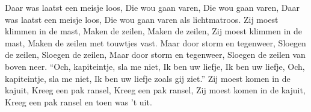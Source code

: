 \beginverse
Daar was laatst een meisje loos, 
Die wou gaan varen,
Die wou gaan varen,
Daar was laatst een meisje loos,
Die wou gaan varen als lichtmatroos.
\endverse
\beginverse
Zij moest klimmen in de mast,
Maken de zeilen,
Maken de zeilen,
Zij moest klimmen in de mast,
Maken de zeilen met touwtjes vast.
\endverse
\beginverse
Maar door storm en tegenweer,
Sloegen de zeilen,
Sloegen de zeilen,
Maar door storm en tegenweer,
Sloegen de zeilen van boven neer. 
\endverse
\beginverse
“Och, kapiteintje, sla me niet,
Ik ben uw liefje,
Ik ben uw liefje,
Och, kapiteintje, sla me niet,
Ik ben uw liefje zoals gij ziet.”
\endverse
\beginverse
Zij moest komen in de kajuit,
Kreeg een pak ransel,
Kreeg een pak ransel,
Zij moest komen in de kajuit,
Kreeg een pak ransel en toen was 't uit. 
\endverse
\endsong